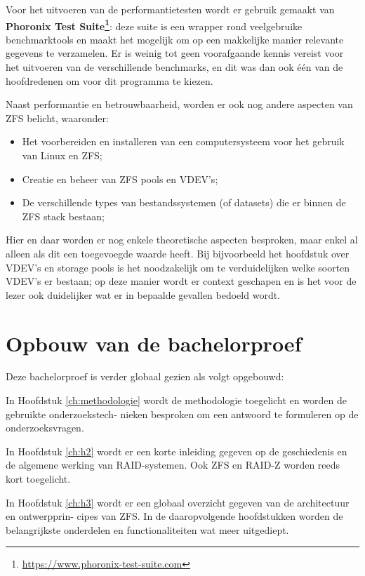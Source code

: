 Voor het uitvoeren van de performantietesten wordt er gebruik gemaakt van \textbf{Phoronix Test Suite\footnote{\url{https://www.phoronix-test-suite.com}}}: deze suite is een wrapper rond veelgebruike benchmarktools en maakt het mogelijk om op een makkelijke manier relevante gegevens te verzamelen. Er is weinig tot geen voorafgaande kennis vereist voor het uitvoeren van de verschillende benchmarks, en dit was dan ook één van de hoofdredenen om voor dit programma te kiezen. 

Naast performantie en betrouwbaarheid, worden er ook nog andere aspecten van ZFS belicht, waaronder:

\begin{itemize}
  \item{Het voorbereiden en installeren van een computersysteem voor het gebruik van Linux en ZFS;}
  \item{Creatie en beheer van ZFS pools en VDEV's;}
  \item{De verschillende types van bestandssystemen (of datasets) die er binnen de ZFS stack bestaan;}
\end{itemize}

Hier en daar worden er nog enkele theoretische aspecten besproken, maar enkel al alleen als dit een toegevoegde waarde heeft. Bij bijvoorbeeld het hoofdstuk over VDEV's en storage pools is het noodzakelijk om te verduidelijken welke soorten VDEV's er bestaan; op deze manier wordt er context geschapen en is het voor de lezer ook duidelijker wat er in bepaalde gevallen bedoeld wordt.

\section{Opbouw van de bachelorproef}

Deze bachelorproef is verder globaal gezien als volgt opgebouwd:

In Hoofdstuk \ref{ch:methodologie} wordt de methodologie toegelicht en worden de gebruikte onderzoekstech-
nieken besproken om een antwoord te formuleren op de onderzoeksvragen.

In Hoofdstuk \ref{ch:h2} wordt er een korte inleiding gegeven op de geschiedenis en de algemene
werking van RAID-systemen. Ook ZFS en RAID-Z worden reeds kort toegelicht.

In Hoofdstuk \ref{ch:h3} wordt er een globaal overzicht gegeven van de architectuur en ontwerpprin-
cipes van ZFS. In de daaropvolgende hoofdstukken worden de belangrijkste onderdelen en
functionaliteiten wat meer uitgediept.

